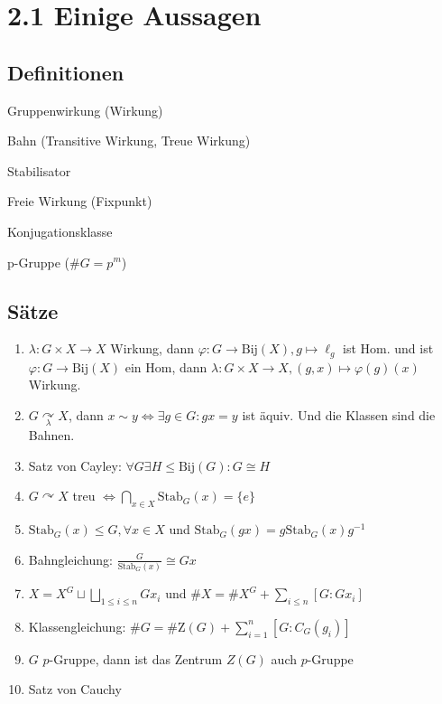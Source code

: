 \documentclass[twocolumn]{report}
\begin{document}
\section*{2.1 Einige Aussagen}
\subsection*{Definitionen}
\begin{enumerate*}[label=2.\arabic*, itemsep=0pt, topsep=0pt, parsep=0pt, partopsep=0pt, leftmargin=*]
    \item Gruppenwirkung (Wirkung)
    \item Bahn (Transitive Wirkung, Treue Wirkung)
    \item Stabilisator
    \item Freie Wirkung (Fixpunkt)
    \item Konjugationsklasse
    \item p-Gruppe ($\#G = p^m$)
\end{enumerate*}

\subsection*{Sätze}
\begin{enumerate}[label=2.\arabic*, itemsep=0pt, topsep=0pt, parsep=0pt, partopsep=0pt, leftmargin=*]
    \item $\lambda:G \times X \to X$ Wirkung, dann $\varphi: G \to \text{Bij}(X), g \mapsto \ell_g$ ist Hom. und ist $\varphi: G \to \text{Bij}(X)$ ein Hom, dann $\lambda: G \times X \to X, (g,x) \mapsto \varphi(g)(x)$ Wirkung.
    \item $G \underset{\lambda}\curvearrowright X$, dann $x\sim y \iff \exists g \in G : gx = y$ ist äquiv. Und die Klassen sind die Bahnen.
    \item Satz von Cayley: $\forall G \exists H \le \text{Bij}(G) : G \cong H$
    \item $G \curvearrowright X$ treu $\iff \bigcap_{x \in X}\text{Stab}_G(x) = \{e\}$
    \item $\text{Stab}_G(x) \le G, \forall x \in X$ und $\text{Stab}_G(gx) = g\text{Stab}_G(x)g^{-1}$
    \item Bahngleichung: $\frac{G}{\text{Stab}_G(x)} \cong Gx$
    \item $X = X^G \sqcup \bigsqcup_{1 \le i \le n}Gx_i$ und $\#X = \#X^G + \sum_{i \le n}[G:Gx_i]$
    \item Klassengleichung: $\# G = \#\text{Z}(G) + \sum_{i = 1}^{n}[G : C_{G}(g_{i})]$
    \item $G$ $p$-Gruppe, dann ist das Zentrum $Z(G)$ auch $p$-Gruppe
    \item Satz von Cauchy
\end{enumerate}
\end{document}
